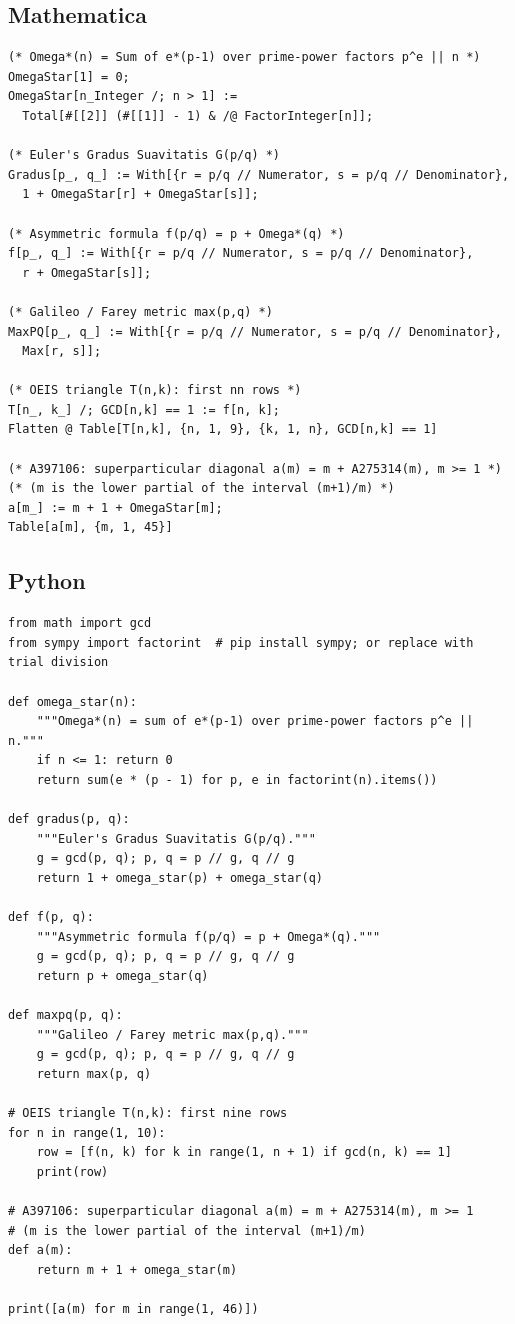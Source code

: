 \documentclass[11pt,a4paper]{article}
\begin{document}
\subsection*{Mathematica}

\begin{verbatim}
(* Omega*(n) = Sum of e*(p-1) over prime-power factors p^e || n *)
OmegaStar[1] = 0;
OmegaStar[n_Integer /; n > 1] :=
  Total[#[[2]] (#[[1]] - 1) & /@ FactorInteger[n]];

(* Euler's Gradus Suavitatis G(p/q) *)
Gradus[p_, q_] := With[{r = p/q // Numerator, s = p/q // Denominator},
  1 + OmegaStar[r] + OmegaStar[s]];

(* Asymmetric formula f(p/q) = p + Omega*(q) *)
f[p_, q_] := With[{r = p/q // Numerator, s = p/q // Denominator},
  r + OmegaStar[s]];

(* Galileo / Farey metric max(p,q) *)
MaxPQ[p_, q_] := With[{r = p/q // Numerator, s = p/q // Denominator},
  Max[r, s]];

(* OEIS triangle T(n,k): first nn rows *)
T[n_, k_] /; GCD[n,k] == 1 := f[n, k];
Flatten @ Table[T[n,k], {n, 1, 9}, {k, 1, n}, GCD[n,k] == 1]

(* A397106: superparticular diagonal a(m) = m + A275314(m), m >= 1 *)
(* (m is the lower partial of the interval (m+1)/m) *)
a[m_] := m + 1 + OmegaStar[m];
Table[a[m], {m, 1, 45}]
\end{verbatim}

\subsection*{Python}

\begin{verbatim}
from math import gcd
from sympy import factorint  # pip install sympy; or replace with trial division

def omega_star(n):
    """Omega*(n) = sum of e*(p-1) over prime-power factors p^e || n."""
    if n <= 1: return 0
    return sum(e * (p - 1) for p, e in factorint(n).items())

def gradus(p, q):
    """Euler's Gradus Suavitatis G(p/q)."""
    g = gcd(p, q); p, q = p // g, q // g
    return 1 + omega_star(p) + omega_star(q)

def f(p, q):
    """Asymmetric formula f(p/q) = p + Omega*(q)."""
    g = gcd(p, q); p, q = p // g, q // g
    return p + omega_star(q)

def maxpq(p, q):
    """Galileo / Farey metric max(p,q)."""
    g = gcd(p, q); p, q = p // g, q // g
    return max(p, q)

# OEIS triangle T(n,k): first nine rows
for n in range(1, 10):
    row = [f(n, k) for k in range(1, n + 1) if gcd(n, k) == 1]
    print(row)

# A397106: superparticular diagonal a(m) = m + A275314(m), m >= 1
# (m is the lower partial of the interval (m+1)/m)
def a(m):
    return m + 1 + omega_star(m)

print([a(m) for m in range(1, 46)])
\end{verbatim}
\end{document}
